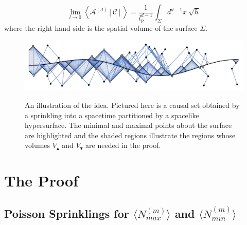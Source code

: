 \documentclass[12pt]{article}
\newcommand{\be}{\begin{equation}}
\newcommand{\ee}{\end{equation}}
\begin{document}
\be\label{eq:conjecture_for_area}
\lim_{l\rightarrow0}\left\langle \mathcal{A}^{(d)}[\mathcal{C}] \right\rangle= \frac{1}{l_p^{d-1}}\int_{\Sigma} d^{d-1}x\: \sqrt{h}
\ee
where the right hand side is the spatial volume of the surface $\Sigma$.

\begin{figure}
  \centering
{\includegraphics[width=\textwidth]{minmaxplot}}
     \caption{An illustration of the idea. Pictured here is a causal set obtained by a sprinkling into a spacetime partitioned by a spacelike hypersurface. The minimal and maximal points about the surface are highlighted and the shaded regions illustrate the regions whose volumes $V_\blacktriangle$ and $V_\blacktriangledown$ are needed in the proof.}
     \label{fig:Nmin_Nmax}
\end{figure}

\section{The Proof}

\subsection{Poisson Sprinklings for $\langle N_{max}^{(m)}\rangle$ and $\langle N_{min}^{(m)}\rangle$}
\end{document}
